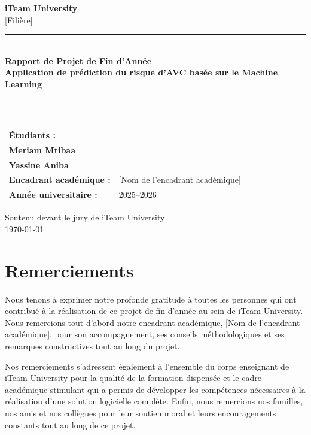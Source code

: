 \documentclass[12pt,a4paper]{report}
\makeatletter
\newcommand{\projecttitle}{Application de prédiction du risque d'AVC basée sur le Machine Learning}
\newcommand{\studentname}{\begin{tabular}[t]{@{}l@{}}Chahine Omri\\Meriam Mtibaa\\Yassine Aniba\end{tabular}}
\newcommand{\academicadvisor}{[Nom de l'encadrant académique]}
\newcommand{\institution}{iTeam University}
\newcommand{\major}{[Filière]}
\makeatother
\begin{document}
\begin{titlepage}
\centering
\vspace*{0.5cm}
{\Large \textbf{\institution}}\\[0.2cm]
{\large \major}\\[1.5cm]

\rule{\textwidth}{0.8pt}\\[0.5cm]
{\Huge \bfseries Rapport de Projet de Fin d'Année}\\[0.7cm]
{\LARGE \bfseries \projecttitle}\\[0.5cm]
\rule{\textwidth}{0.8pt}\\[1.5cm]

\begin{tabularx}{\textwidth}{>{\bfseries}l X}
Étudiants : & \studentname \\[0.3cm]
Encadrant académique : & \academicadvisor \\[0.3cm]
Année universitaire : & 2025--2026 \\
\end{tabularx}

\vfill
{\large Soutenu devant le jury de \institution}\\[0.4cm]
{\large \today}
\end{titlepage}


\chapter*{Remerciements}
Nous tenons à exprimer notre profonde gratitude à toutes les personnes qui ont contribué à la réalisation de ce projet de fin d'année au sein de \institution. Nous remercions tout d'abord notre encadrant académique, \academicadvisor, pour son accompagnement, ses conseils méthodologiques et ses remarques constructives tout au long du projet.

Nos remerciements s'adressent également à l'ensemble du corps enseignant de \institution{} pour la qualité de la formation dispensée et le cadre académique stimulant qui a permis de développer les compétences nécessaires à la réalisation d'une solution logicielle complète. Enfin, nous remercions nos familles, nos amis et nos collègues pour leur soutien moral et leurs encouragements constants tout au long de ce projet.
\end{document}

